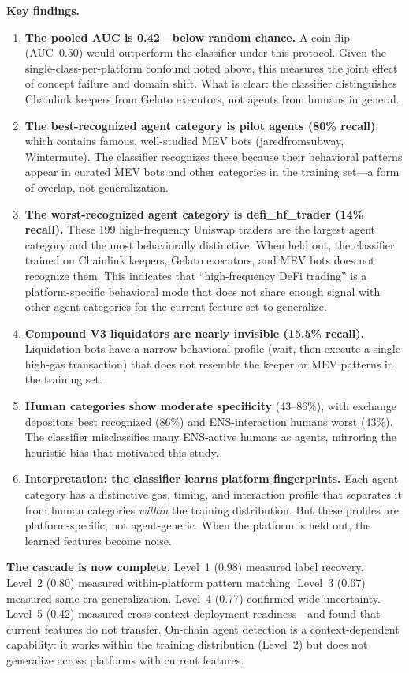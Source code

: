 \documentclass[sigconf,nonacm=false]{acmart}
\begin{document}
\textbf{Key findings.}

\begin{enumerate}
    \item \textbf{The pooled AUC is 0.42---below random chance.} A coin flip (AUC~0.50) would outperform the classifier under this protocol. Given the single-class-per-platform confound noted above, this measures the joint effect of concept failure and domain shift. What is clear: the classifier distinguishes Chainlink keepers from Gelato executors, not agents from humans in general.
    \item \textbf{The best-recognized agent category is pilot agents (80\% recall)}, which contains famous, well-studied MEV bots (jaredfromsubway, Wintermute). The classifier recognizes these because their behavioral patterns appear in curated MEV bots and other categories in the training set---a form of overlap, not generalization.
    \item \textbf{The worst-recognized agent category is defi\_hf\_trader (14\% recall).} These 199 high-frequency Uniswap traders are the largest agent category and the most behaviorally distinctive. When held out, the classifier trained on Chainlink keepers, Gelato executors, and MEV bots does not recognize them. This indicates that ``high-frequency DeFi trading'' is a platform-specific behavioral mode that does not share enough signal with other agent categories for the current feature set to generalize.
    \item \textbf{Compound V3 liquidators are nearly invisible (15.5\% recall).} Liquidation bots have a narrow behavioral profile (wait, then execute a single high-gas transaction) that does not resemble the keeper or MEV patterns in the training set.
    \item \textbf{Human categories show moderate specificity} (43--86\%), with exchange depositors best recognized (86\%) and ENS-interaction humans worst (43\%). The classifier misclassifies many ENS-active humans as agents, mirroring the heuristic bias that motivated this study.
    \item \textbf{Interpretation: the classifier learns platform fingerprints.} Each agent category has a distinctive gas, timing, and interaction profile that separates it from human categories \emph{within} the training distribution. But these profiles are platform-specific, not agent-generic. When the platform is held out, the learned features become noise.
\end{enumerate}

\textbf{The cascade is now complete.} Level~1 (0.98) measured label recovery. Level~2 (0.80) measured within-platform pattern matching. Level~3 (0.67) measured same-era generalization. Level~4 (0.77) confirmed wide uncertainty. Level~5 (0.42) measured cross-context deployment readiness---and found that current features do not transfer. On-chain agent detection is a context-dependent capability: it works within the training distribution (Level~2) but does not generalize across platforms with current features.
\end{document}
